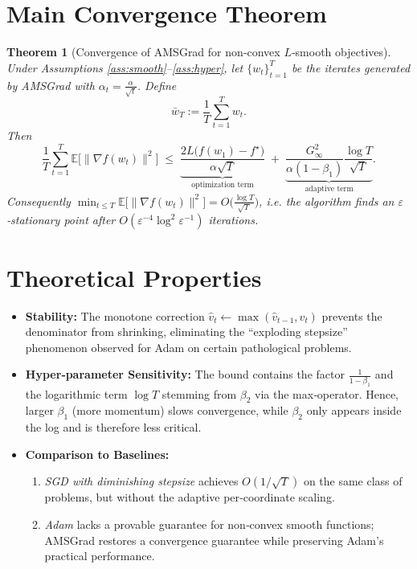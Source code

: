 \documentclass{article}
\newtheorem{theorem}{Theorem}
\begin{document}
\section*{Main Convergence Theorem}
\begin{theorem}[Convergence of AMSGrad for non‑convex $L$‑smooth objectives]\label{thm:main}
Under Assumptions \ref{ass:smooth}–\ref{ass:hyper}, let $\{w_t\}_{t=1}^T$ be the iterates generated by AMSGrad with $\alpha_t=\frac{\alpha}{\sqrt{t}}$. Define
\[
\bar w_T:=\frac{1}{T}\sum_{t=1}^T w_t .
\]
Then
\[
\frac{1}{T}\sum_{t=1}^T \mathbb{E}\bigl[\|\nabla f(w_t)\|^2\bigr]
    \;\le\;
    \underbrace{\frac{2L\bigl(f(w_1)-f^\star\bigr)}{\alpha \sqrt{T}}}_{\text{optimization term}}
    \;+\;
    \underbrace{\frac{G_\infty^2}{\alpha(1-\beta_1)}\frac{\log T}{\sqrt{T}}}_{\text{adaptive term}} .
\]
Consequently $\displaystyle \min_{t\le T}\mathbb{E}\bigl[\|\nabla f(w_t)\|^2\bigr]=O\!\bigl(\tfrac{\log T}{\sqrt{T}}\bigr)$, i.e. the algorithm finds an $\varepsilon$‑stationary point after $O(\varepsilon^{-4}\log^2\! \varepsilon^{-1})$ iterations.
\end{theorem}

\section*{Theoretical Properties}
\begin{itemize}[leftmargin=*]
\item \textbf{Stability:} The monotone correction $\hat v_t\gets\max(\hat v_{t-1},v_t)$ prevents the denominator from shrinking, eliminating the “exploding stepsize” phenomenon observed for Adam on certain pathological problems.
\item \textbf{Hyper‑parameter Sensitivity:} The bound contains the factor $\frac{1}{1-\beta_1}$ and the logarithmic term $\log T$ stemming from $\beta_2$ via the max‑operator. Hence, larger $\beta_1$ (more momentum) slows convergence, while $\beta_2$ only appears inside the log and is therefore less critical.
\item \textbf{Comparison to Baselines:}
   \begin{enumerate}
   \item \textit{SGD with diminishing stepsize} achieves $O(1/\sqrt{T})$ on the same class of problems, but without the adaptive per‑coordinate scaling.
   \item \textit{Adam} lacks a provable guarantee for non‑convex smooth functions; AMSGrad restores a convergence guarantee while preserving Adam’s practical performance.
   \end{enumerate}
\end{itemize}
\end{document}
